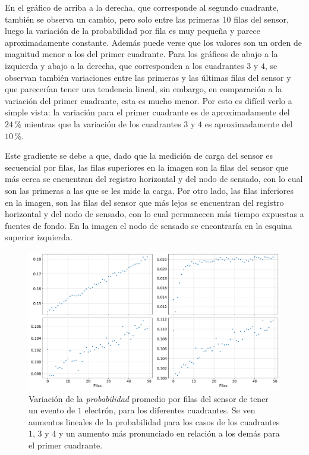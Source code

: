 En el gráfico de arriba a la derecha, que corresponde al segundo cuadrante, también se observa un cambio, pero solo entre las primeras 10 filas del sensor, luego la variación de la probabilidad por fila es muy pequeña y parece aproximadamente constante. Además puede verse que los valores son un orden de magnitud menor a los del primer cuadrante. Para los gráficos de abajo a la izquierda y abajo a la derecha, que corresponden a los cuadrantes $3$ y $4$, se observan también variaciones entre las primeras y las últimas filas del sensor y que parecerían tener una tendencia lineal, sin embargo, en comparación a la variación del primer cuadrante, esta es mucho menor. Por esto es difícil verlo a simple vista: la variación para el primer cuadrante es de aproximadamente del $24\,\%$ mientras que la variación de los cuadrantes $3$ y $4$ es aproximadamente del $10\,\%$.

Este gradiente se debe a que, dado que la medición de carga del sensor es secuencial por filas, las filas superiores en la imagen son la filas del sensor que más cerca se encuentran del registro horizontal y del nodo de sensado, con lo cual son las primeras a las que se les mide la carga. Por otro lado, las filas inferiores en la imagen, son las filas del sensor que más lejos se encuentran del registro horizontal y del nodo de sensado, con lo cual permanecen más tiempo expuestas a fuentes de fondo. En la imagen el nodo de sensado se encontraría en la esquina superior izquierda.
\begin{figure}[h]
    \centering
    \includegraphics[scale=0.45]{Figs/Gradiente_en_filas_sensor.pdf}
    \caption{Variación de la \textit{probabilidad} promedio por filas del sensor de tener un evento de $1$ electrón, para los diferentes cuadrantes. Se ven aumentos lineales de la probabilidad para los casos de los cuadrantes $1$, $3$ y $4$ y un aumento más pronunciado en relación a los demás para el primer cuadrante.}
    \label{fig:GradienteProb}
\end{figure}


